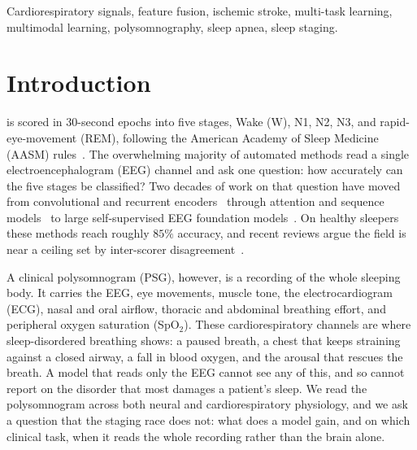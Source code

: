 \documentclass{ieeeaccess}
\begin{document}
\begin{keywords}
Cardiorespiratory signals, feature fusion, ischemic stroke, multi-task learning,
multimodal learning, polysomnography, sleep apnea, sleep staging.
\end{keywords}

\maketitle



\section{Introduction}
 is scored in 30-second epochs into five stages, Wake (W), N1, N2,
N3, and rapid-eye-movement (REM), following the American Academy of Sleep Medicine (AASM)
rules~\cite{aasm2023manual}. The overwhelming majority of automated methods read a single
electroencephalogram (EEG) channel and ask one question: how accurately can the five stages
be classified? Two decades of work on that question have moved from convolutional and
recurrent encoders~\cite{supratak2017deepsleepnet,phan2019seqsleepnet,supratak2020tinysleepnet}
through attention and sequence models~\cite{eldele2021attnsleep,phan2021xsleepnet,
perslev2019utime} to large self-supervised EEG foundation
models~\cite{labram2024,cbramod2025,eegpt2024,biot2023}. On healthy sleepers these methods
reach roughly $85\%$ accuracy, and recent reviews argue the field is near a ceiling set by
inter-scorer disagreement~\cite{phan2022survey,yang2026review}.

A clinical polysomnogram (PSG), however, is a recording of the whole sleeping body. It
carries the EEG, eye movements, muscle tone, the electrocardiogram (ECG), nasal and oral
airflow, thoracic and abdominal breathing effort, and peripheral oxygen saturation
(SpO$_2$). These cardiorespiratory channels are where sleep-disordered breathing shows: a paused breath, a chest that keeps straining against a closed airway, a fall in
blood oxygen, and the arousal that rescues the breath. A model that reads only the EEG
cannot see any of this, and so cannot report on the disorder that most damages a patient's
sleep. We read the polysomnogram across both neural and cardiorespiratory physiology, and we
ask a question that the staging race does not:
what does a model gain, and on which clinical task, when it reads the whole recording rather
than the brain alone.
\end{document}
